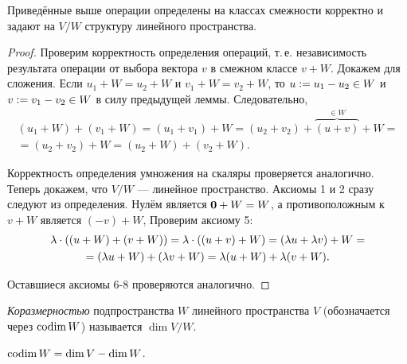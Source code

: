 \begin{proposal}
    Приведённые выше операции определены на классах смежности корректно и задают на $V / W$ структуру линейного пространства.
\end{proposal}

\begin{proof}
    Проверим корректность определения операций, т.\,е. независимость результата операции от выбора вектора $v$ в смежном классе $v + W$. Докажем для сложения. Если $u_1 + W = u_2 + W$ и $v_1 + W = v_2 + W$, то $u \vcentcolon = u_1 - u_2 \in W$ и $v \vcentcolon = v_1 - v_2 \in W$ в силу предыдущей леммы. Следовательно,
    \begin{multline*}
        (u_1 + W) + (v_1 + W) = (u_1 + v_1) + W = (u_2 + v_2) + \overbrace{(u + v)}^{\in W} + W =\\ = (u_2 + v_2) + W = (u_2 + W) + (v_2 + W).
    \end{multline*}

    Корректность определения умножения на скаляры проверяется аналогично. Теперь докажем, что $V / W$ --- линейное пространство. Аксиомы 1 и 2 сразу следуют из определения. Нулём является $\boldsymbol{0} + W = W$, а противоположным к $v + W$ является $(-v) + W$, Проверим аксиому 5:
    \begin{multline*}
        \lambda \cdot \left((u + W) + (v + W)\right) = \lambda \cdot \left((u + v) + W\right) = (\lambda u + \lambda v) + W =\\ = (\lambda u + W) + (\lambda v + W) = \lambda(u + W) + \lambda(v + W).
    \end{multline*}

    Оставшиеся аксиомы 6-8 проверяются аналогично.
\end{proof}

\begin{definition}
    \textit{Коразмерностью} подпространства $W$ линейного пространства $V$ (обозначается через $\operatorname{codim} W$) называется $\dim V / W$.
\end{definition}

\begin{theorem}
    $\operatorname{codim} W = \dim V - \dim W$.
\end{theorem}

